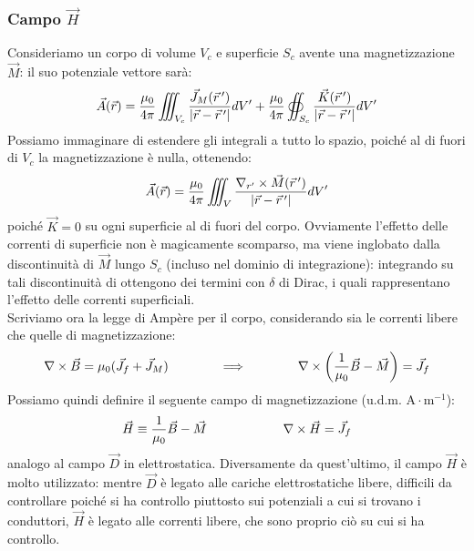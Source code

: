 \subsubsection{Campo $ \vec{H} $}

Consideriamo un corpo di volume $ V_c $ e superficie $ S_c $ avente una magnetizzazione $ \vec{M} $: il suo potenziale vettore sarà:
\begin{equation}
	\vec{A}(\vec{r}) = \frac{\mu_0}{4\pi} \iiint_{V_c} \frac{\vec{J}_M(\vec{r}\,')}{\left\lvert\vec{r}-\vec{r}\,'\right\rvert} dV' + \frac{\mu_0}{4\pi} \oiint_{S_c} \frac{\vec{K}(\vec{r}\,')}{\left\lvert\vec{r}-\vec{r}\,'\right\rvert} dV'
	\label{eq:20}
\end{equation}
Possiamo immaginare di estendere gli integrali a tutto lo spazio, poiché al di fuori di $ V_c $ la magnetizzazione è nulla, ottenendo:
\begin{equation}
	\vec{A}(\vec{r}) = \frac{\mu_0}{4\pi} \iiint_V \frac{\nabla_{r'}\times\vec{M}(\vec{r}\,')}{\left\lvert\vec{r}-\vec{r}\,'\right\rvert}dV'
	\label{eq:21}
\end{equation}
poiché $ \vec{K} = 0 $ su ogni superficie al di fuori del corpo. Ovviamente l'effetto delle correnti di superficie non è magicamente scomparso, ma viene inglobato dalla discontinuità di $ \vec{M} $ lungo $ S_c $ (incluso nel dominio di integrazione): integrando su tali discontinuità di ottengono dei termini con $ \delta $ di Dirac, i quali rappresentano l'effetto delle correnti superficiali. \\ 
%
Scriviamo ora la legge di Ampère per il corpo, considerando sia le correnti libere che quelle di magnetizzazione:
\begin{equation}
	\nabla\times\vec{B} = \mu_0 (\vec{J}_f + \vec{J}_M) \qquad\qquad\Longrightarrow\qquad\qquad \nabla\times\left(\frac{1}{\mu_0}\vec{B} - \vec{M}\right) = \vec{J}_f
	\label{eq:22}
\end{equation}
Possiamo quindi definire il seguente campo di magnetizzazione (u.d.m. $ \text{A}\cdot\text{m}^{-1} $):
\begin{equation}
	\vec{H} \equiv \frac{1}{\mu_0} \vec{B} - \vec{M} \qquad\qquad\qquad \nabla\times\vec{H} = \vec{J}_f
	\label{eq:23}
\end{equation}
analogo al campo $ \vec{D} $ in elettrostatica. Diversamente da quest'ultimo, il campo $ \vec{H} $ è molto utilizzato: mentre $ \vec{D} $ è legato alle cariche elettrostatiche libere, difficili da controllare poiché si ha controllo piuttosto sui potenziali a cui si trovano i conduttori, $ \vec{H} $ è legato alle correnti libere, che sono proprio ciò su cui si ha controllo. \\ 
